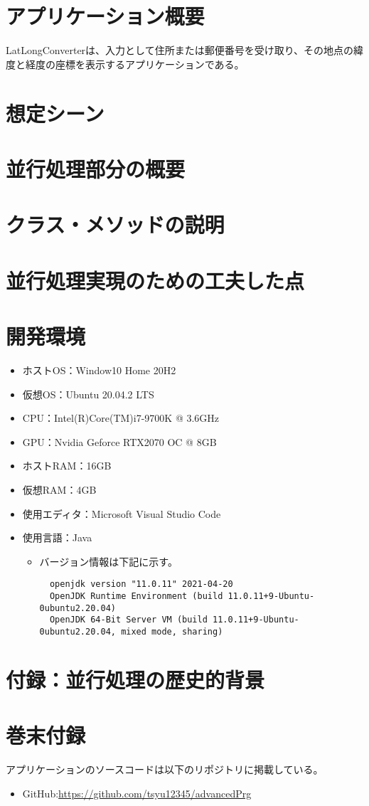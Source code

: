 \documentclass[dvipdfmx, titlepage]{jsarticle}
\begin{document}
\section{アプリケーション概要}
LatLongConverterは、入力として住所または郵便番号を受け取り、その地点の緯度と経度の座標を表示するアプリケーションである。
\section{想定シーン}
\section{並行処理部分の概要}
\section{クラス・メソッドの説明}
\section{並行処理実現のための工夫した点}
\section{開発環境}
\begin{itemize}
  \item ホストOS：Window10 Home 20H2
  \item 仮想OS：Ubuntu 20.04.2 LTS
  \item CPU：Intel(R)Core(TM)i7-9700K @ 3.6GHz
  \item GPU：Nvidia Geforce RTX2070 OC @ 8GB
  \item ホストRAM：16GB
  \item 仮想RAM：4GB
  \item 使用エディタ：Microsoft Visual Studio Code
  \item 使用言語：Java
  \begin{itemize}
    \item バージョン情報は下記に示す。
    \begin{verbatim}
  openjdk version "11.0.11" 2021-04-20
  OpenJDK Runtime Environment (build 11.0.11+9-Ubuntu-0ubuntu2.20.04)
  OpenJDK 64-Bit Server VM (build 11.0.11+9-Ubuntu-0ubuntu2.20.04, mixed mode, sharing)
    \end{verbatim}
  \end{itemize}
\end{itemize}
\section{付録：並行処理の歴史的背景}
\section{巻末付録}
アプリケーションのソースコードは以下のリポジトリに掲載している。
\begin{itemize}
  \item GitHub:\url{https://github.com/tsyu12345/advancedPrg}
\end{itemize}
\end{document}
